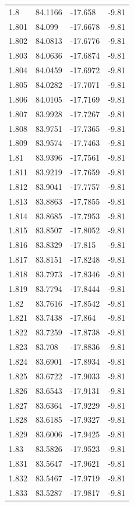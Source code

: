 \begin{tabular}{llll}
1.8 & 84.1166 & -17.658 & -9.81 \\
1.801 & 84.099 & -17.6678 & -9.81 \\
1.802 & 84.0813 & -17.6776 & -9.81 \\
1.803 & 84.0636 & -17.6874 & -9.81 \\
1.804 & 84.0459 & -17.6972 & -9.81 \\
1.805 & 84.0282 & -17.7071 & -9.81 \\
1.806 & 84.0105 & -17.7169 & -9.81 \\
1.807 & 83.9928 & -17.7267 & -9.81 \\
1.808 & 83.9751 & -17.7365 & -9.81 \\
1.809 & 83.9574 & -17.7463 & -9.81 \\
1.81 & 83.9396 & -17.7561 & -9.81 \\
1.811 & 83.9219 & -17.7659 & -9.81 \\
1.812 & 83.9041 & -17.7757 & -9.81 \\
1.813 & 83.8863 & -17.7855 & -9.81 \\
1.814 & 83.8685 & -17.7953 & -9.81 \\
1.815 & 83.8507 & -17.8052 & -9.81 \\
1.816 & 83.8329 & -17.815 & -9.81 \\
1.817 & 83.8151 & -17.8248 & -9.81 \\
1.818 & 83.7973 & -17.8346 & -9.81 \\
1.819 & 83.7794 & -17.8444 & -9.81 \\
1.82 & 83.7616 & -17.8542 & -9.81 \\
1.821 & 83.7438 & -17.864 & -9.81 \\
1.822 & 83.7259 & -17.8738 & -9.81 \\
1.823 & 83.708 & -17.8836 & -9.81 \\
1.824 & 83.6901 & -17.8934 & -9.81 \\
1.825 & 83.6722 & -17.9033 & -9.81 \\
1.826 & 83.6543 & -17.9131 & -9.81 \\
1.827 & 83.6364 & -17.9229 & -9.81 \\
1.828 & 83.6185 & -17.9327 & -9.81 \\
1.829 & 83.6006 & -17.9425 & -9.81 \\
1.83 & 83.5826 & -17.9523 & -9.81 \\
1.831 & 83.5647 & -17.9621 & -9.81 \\
1.832 & 83.5467 & -17.9719 & -9.81 \\
1.833 & 83.5287 & -17.9817 & -9.81 \\

\end{tabular}
